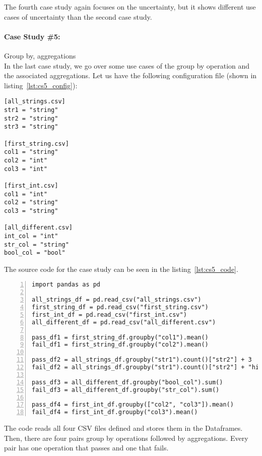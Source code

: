 The fourth case study again focuses on the uncertainty, but it shows different use cases of uncertainty than the second
case study.

\paragraph{Case Study \#5:} Group by, aggregations \\

In the last case study, we go over some use cases of the group by operation and the associated aggregations.
Let us have the following configuration file (shown in listing~\ref{lst:cs5_config}):

\begin{lstlisting}[caption=config.toml file for the fifth case study, label={lst:cs5_config}, captionpos=b]
[all_strings.csv]
str1 = "string"
str2 = "string"
str3 = "string"

[first_string.csv]
col1 = "string"
col2 = "int"
col3 = "int"

[first_int.csv]
col1 = "int"
col2 = "string"
col3 = "string"

[all_different.csv]
int_col = "int"
str_col = "string"
bool_col = "bool"
\end{lstlisting}

The source code for the case study can be seen in the listing~\ref{lst:cs5_code}.

\begin{lstlisting}[caption=Code of the fifth case study in Pandas, label={lst:cs5_code}, captionpos=b, numbers=left]
import pandas as pd

all_strings_df = pd.read_csv("all_strings.csv")
first_string_df = pd.read_csv("first_string.csv")
first_int_df = pd.read_csv("first_int.csv")
all_different_df = pd.read_csv("all_different.csv")

pass_df1 = first_string_df.groupby("col1").mean()
fail_df1 = first_string_df.groupby("col2").mean()

pass_df2 = all_strings_df.groupby("str1").count()["str2"] + 3
fail_df2 = all_strings_df.groupby("str1").count()["str2"] + "hi"

pass_df3 = all_different_df.groupby("bool_col").sum()
fail_df3 = all_different_df.groupby("str_col").sum()

pass_df4 = first_int_df.groupby(["col2", "col3"]).mean()
fail_df4 = first_int_df.groupby("col3").mean()
\end{lstlisting}

The code reads all four CSV files defined and stores them in the Dataframes.
Then, there are four pairs group by operations followed by aggregations.
Every pair has one operation that passes and one that fails.

